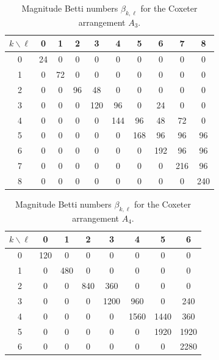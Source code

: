 \documentclass{amsart}
\numberwithin{equation}{section}
\theoremstyle{plain}
\theoremstyle{remark}
\theoremstyle{definition}
\numberwithin{equation}{section}
\begin{document}
    
\begin{table}[htpb]
\centering
\begin{tabular}{c|ccccccccc}
\hline
$k \backslash \ell$ & 0 & 1 & 2 & 3 & 4 & 5 & 6 & 7 & 8 \\
\hline
0 & 24 & 0  & 0  & 0   & 0   & 0   & 0   & 0  & 0 \\
1 & 0  & 72 & 0  & 0   & 0   & 0   & 0   & 0  & 0\\
2 & 0  & 0  & 96 & 48  & 0   & 0   & 0   & 0  & 0\\
3 & 0  & 0  & 0  & 120 & 96  & 0  & 24   & 0  & 0\\
4 & 0  & 0  & 0  & 0   & 144 & 96  & 48  & 72  & 0\\
5 & 0  & 0  & 0  & 0   & 0   & 168 & 96  & 96  & 96\\
6 & 0  & 0  & 0  & 0   & 0   & 0   & 192 & 96  & 96\\
7 & 0  & 0  & 0  & 0   & 0   & 0   & 0   & 216 & 96\\
8 & 0  & 0  & 0  & 0   & 0   & 0   & 0   & 0 & 240\\
\hline
\end{tabular}
\vspace{1ex}
\caption{Magnitude Betti numbers $\beta_{k,\ell}$ for the Coxeter arrangement $A_3$.}
\label{tab:A3}
\end{table}

\begin{table}[htpb]
\centering
\begin{tabular}{c|ccccccc}
\hline
$k \backslash \ell$ & 0 & 1 & 2 & 3 & 4 & 5 & 6  \\
\hline
0 & 120 & 0  & 0  & 0   & 0   & 0    & 0  \\
1 & 0  & 480 & 0  & 0   & 0   & 0     & 0 \\
2 & 0  & 0  & 840 & 360  & 0   & 0    & 0  \\
3 & 0  & 0  & 0  & 1200 & 960  & 0   & 240  \\
4 & 0  & 0  & 0  & 0   & 1560 & 1440  & 360  \\
5 & 0  & 0  & 0  & 0   & 0   & 1920   & 1920 \\
6 & 0  & 0  & 0  & 0  & 0   &  0   & 2280\\
\hline
\end{tabular}
\vspace{1ex}
\caption{Magnitude Betti numbers $\beta_{k,\ell}$ for the Coxeter arrangement $A_4$.}
\label{tab:A4}
\end{table}
\end{document}

